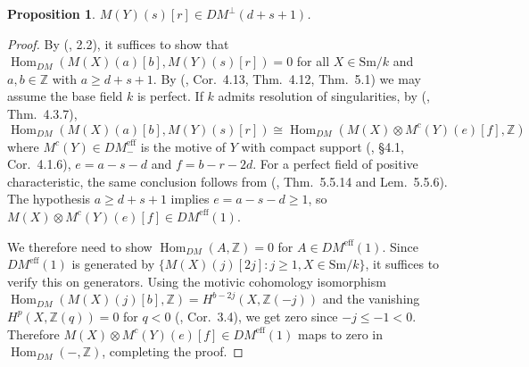 \documentclass[12pt,a4paper]{article}
\newtheorem{proposition}[theorem]{Proposition}
\theoremstyle{definition}
\newcommand{\Sm}{\mathrm{Sm}}
\newcommand{\DMeff}{DM^{\mathrm{eff}}_{-}}
\newcommand{\Hom}{\operatorname{Hom}}
\newcommand{\Z}{\mathbb{Z}}
\begin{document}
\begin{proposition}\label{prop:orthogonality}
$M(Y)(s)[r]\in DM^\perp(d+s+1)$.
\end{proposition}
\begin{proof}
By (\cite{Pel17}, 2.2), it suffices to show that
$\Hom_{DM}(M(X)(a)[b], M(Y)(s)[r])=0$ for all $X\in\Sm/k$ and
$a,b\in\Z$ with $a\geq d+s+1$.  By (\cite{Kel13}, Cor.\ 4.13, Thm.\ 4.12, Thm.\ 5.1)
we may assume the base field $k$ is perfect.  If $k$ admits resolution of
singularities, by (\cite{VSF00}, Thm.\ 4.3.7),
\[
  \Hom_{DM}(M(X)(a)[b],M(Y)(s)[r])
  \cong\Hom_{DM}(M(X)\otimes M^c(Y)(e)[f],\Z)
\]
where $M^c(Y)\in\DMeff$ is the motive of $Y$ with compact support (\cite{VSF00},
\S4.1, Cor.\ 4.1.6), $e=a-s-d$ and $f=b-r-2d$.  For a perfect field of positive
characteristic, the same conclusion follows from (\cite{Sus17}, Thm.\ 5.5.14 and
Lem.\ 5.5.6).  The hypothesis $a\geq d+s+1$ implies $e=a-s-d\geq 1$, so
$M(X)\otimes M^c(Y)(e)[f]\in DM^{\mathrm{eff}}(1)$.

We therefore need to show $\Hom_{DM}(A,\Z)=0$ for $A\in DM^{\mathrm{eff}}(1)$.
Since $DM^{\mathrm{eff}}(1)$ is generated by $\{M(X)(j)[2j]: j\geq 1, X\in\Sm/k\}$,
it suffices to verify this on generators.  Using the motivic cohomology isomorphism
$\Hom_{DM}(M(X)(j)[b],\Z) = H^{b-2j}(X,\Z(-j))$ and the vanishing
$H^p(X,\Z(q))=0$ for $q<0$ (\cite{VSF00}, Cor.\ 3.4), we get zero since $-j\leq -1<0$.
Therefore $M(X)\otimes M^c(Y)(e)[f]\in DM^{\mathrm{eff}}(1)$ maps to zero in
$\Hom_{DM}(-,\Z)$, completing the proof.
\end{proof}
\end{document}
